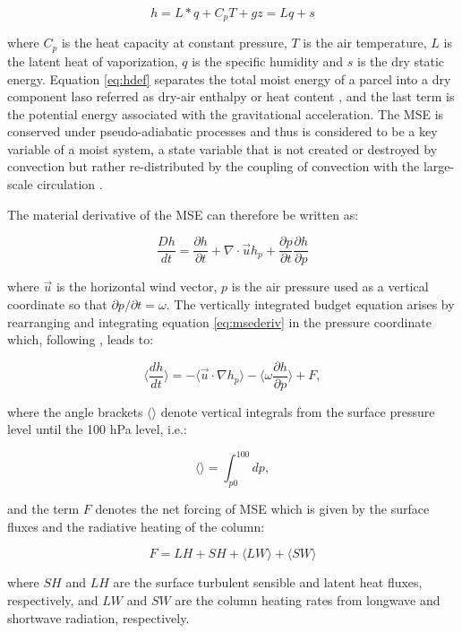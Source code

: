 \begin{equation}
h=L*q+C_pT+gz=Lq+s
\label{eq:hdef}
\end{equation}

\noindent where $C_p$ is the heat capacity at constant pressure, $T$ is the air temperature, $L$ is the latent heat of vaporization, $q$ is the specific humidity and $s$ is the dry static energy. 
Equation \ref{eq:hdef} separates the total moist energy of a parcel into a dry component laso referred as dry-air enthalpy or heat content \citep{emanuel2007quasi}, and the last term is the potential energy associated with the gravitational acceleration. 
The MSE is conserved under pseudo-adiabatic processes and thus is considered to be a key variable of a moist system, a state variable that is not created or destroyed by convection but rather re-distributed by the coupling of convection with the large-scale circulation \citep{chou2004,emanuel2007quasi}.

The material derivative of the MSE can therefore be written as:

\begin{equation}
\frac{Dh}{dt}=\frac{\partial h}{\partial t}+\nabla\cdot{\vec{u}h}_p+\frac{\partial p}{\partial t}\frac{\partial h}{\partial p}
\label{eq:msederiv}
\end{equation}

\noindent where $\vec{u}$ is the horizontal wind vector, $p$ is the air pressure used as a vertical coordinate so that $\partial p/\partial t = \omega$. 
The vertically integrated budget equation arises by rearranging and integrating equation \ref{eq:msederiv} in the pressure coordinate which, following \cite{annamalai2020}, leads to:

\begin{equation}
\Bigg\langle \frac{d h}{dt} \Bigg\rangle=-\Bigg\langle \vec{u}\cdot\nabla h _p \Bigg\rangle -\Bigg\langle \omega\frac{\partial h}{\partial p}\Bigg\rangle + F,
\label{eq:msebudget}
\end{equation}

\noindent where the angle brackets $\langle \rangle$ denote vertical integrals from the surface pressure level until the 100 hPa level, i.e.:

\begin{equation}
\Bigg\langle \Bigg\rangle= \int_{p0}^{100} dp, 
\end{equation}

\noindent and the term $F$ denotes the net forcing of MSE which is given by the surface fluxes and the radiative heating of the column:

\begin{equation}
F= LH+SH+\langle LW \rangle + \langle  SW \rangle
\end{equation}

\noindent where $SH$ and $LH$ are the surface turbulent sensible and latent heat fluxes, respectively, and $LW$ and $SW$ are the column heating rates from longwave and shortwave radiation, respectively.